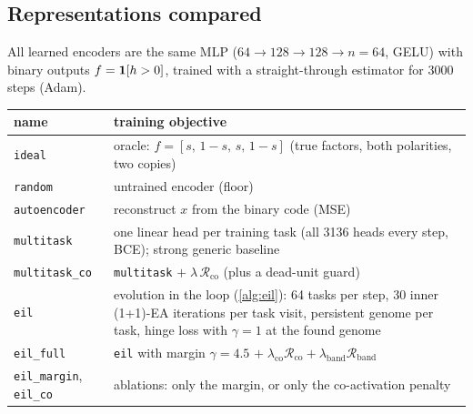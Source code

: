 \documentclass[11pt,a4paper]{article}
\theoremstyle{definition}
\theoremstyle{plain}
\theoremstyle{remark}
\newcommand{\ind}[1]{\one\!\left[#1\right]}
\begin{document}
\subsection{Representations compared}
All learned encoders are the same MLP ($64\to128\to128\to n{=}64$, GELU) with binary outputs $f=\ind{h>0}$, trained with a straight-through estimator for 3000 steps (Adam).

\begin{center}
\small
\begin{tabularx}{\linewidth}{@{}lY@{}}
\toprule
name & training objective \\
\midrule
\texttt{ideal} & oracle: $f=[s,\,1-s,\,s,\,1-s]$ (true factors, both polarities, two copies) \\
\texttt{random} & untrained encoder (floor) \\
\texttt{autoencoder} & reconstruct $x$ from the binary code (MSE) \\
\texttt{multitask} & one linear head per training task (all 3136 heads every step, BCE); strong generic baseline \\
\texttt{multitask\_co} & \texttt{multitask} $+\;\lambda\,\mathcal{R}_{\text{co}}$ (plus a dead-unit guard) \\
\texttt{eil} & evolution in the loop (\cref{alg:eil}): 64 tasks per step, 30 inner (1+1)-EA iterations per task visit, persistent genome per task, hinge loss with $\gamma=1$ at the found genome \\
\texttt{eil\_full} & \texttt{eil} with margin $\gamma=4.5$ $+\;\lambda_{\text{co}}\mathcal{R}_{\text{co}}+\lambda_{\text{band}}\mathcal{R}_{\text{band}}$ \\
\texttt{eil\_margin}, \texttt{eil\_co} & ablations: only the margin, or only the co-activation penalty \\
\bottomrule
\end{tabularx}
\end{center}
\end{document}

